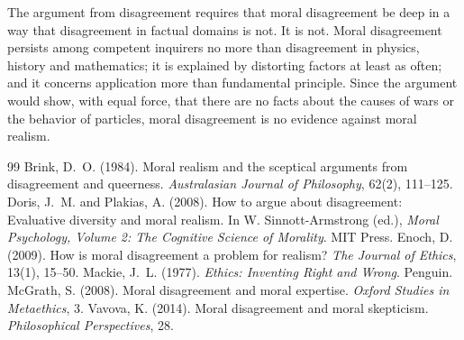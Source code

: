 \documentclass{situationist-preprint}
\begin{document}
The argument from disagreement requires that moral disagreement be deep in a way that disagreement in factual domains is not. It is not. Moral disagreement persists among competent inquirers no more than disagreement in physics, history and mathematics; it is explained by distorting factors at least as often; and it concerns application more than fundamental principle. Since the argument would show, with equal force, that there are no facts about the causes of wars or the behavior of particles, moral disagreement is no evidence against moral realism.

\begin{thebibliography}{99}\small
{} Brink, D.~O. (1984). Moral realism and the sceptical arguments from disagreement and queerness. \emph{Australasian Journal of Philosophy}, 62(2), 111--125.
 Doris, J.~M. and Plakias, A. (2008). How to argue about disagreement: Evaluative diversity and moral realism. In W. Sinnott-Armstrong (ed.), \emph{Moral Psychology, Volume 2: The Cognitive Science of Morality}. MIT Press.
 Enoch, D. (2009). How is moral disagreement a problem for realism? \emph{The Journal of Ethics}, 13(1), 15--50.
 Mackie, J.~L. (1977). \emph{Ethics: Inventing Right and Wrong}. Penguin.
 McGrath, S. (2008). Moral disagreement and moral expertise. \emph{Oxford Studies in Metaethics}, 3.
 Vavova, K. (2014). Moral disagreement and moral skepticism. \emph{Philosophical Perspectives}, 28.
\end{thebibliography}
\end{document}
